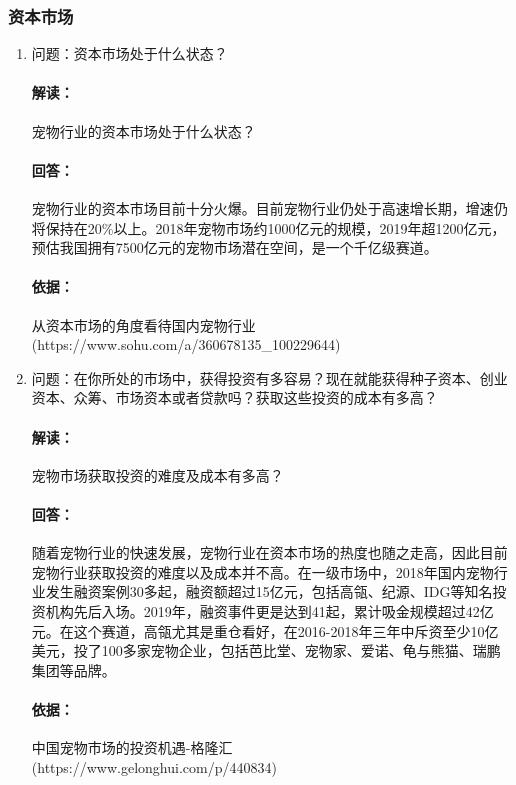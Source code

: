 \documentclass[a4paper]{ctexart}
\begin{document}
\subsubsection{资本市场}
\begin{enumerate}[label=\alph*.]
  \item 问题：资本市场处于什么状态？
  \paragraph{解读：}宠物行业的资本市场处于什么状态？
  \paragraph{回答：}宠物行业的资本市场目前十分火爆。目前宠物行业仍处于高速增长期，增速仍将保持在20\%以上。2018年宠物市场约1000亿元的规模，2019年超1200亿元，预估我国拥有7500亿元的宠物市场潜在空间，是一个千亿级赛道。
  \paragraph{依据：}从资本市场的角度看待国内宠物行业\\(https://www.sohu.com/a/360678135\_100229644)
  \item 问题：在你所处的市场中，获得投资有多容易？现在就能获得种子资本、创业资本、众筹、市场资本或者贷款吗？获取这些投资的成本有多高？
  \paragraph{解读：}宠物市场获取投资的难度及成本有多高？
  \paragraph{回答：}随着宠物行业的快速发展，宠物行业在资本市场的热度也随之走高，因此目前宠物行业获取投资的难度以及成本并不高。在一级市场中，2018年国内宠物行业发生融资案例30多起，融资额超过15亿元，包括高瓴、纪源、IDG等知名投资机构先后入场。2019年，融资事件更是达到41起，累计吸金规模超过42亿元。在这个赛道，高瓴尤其是重仓看好，在2016-2018年三年中斥资至少10亿美元，投了100多家宠物企业，包括芭比堂、宠物家、爱诺、龟与熊猫、瑞鹏集团等品牌。
  \paragraph{依据：}中国宠物市场的投资机遇-格隆汇 \\(https://www.gelonghui.com/p/440834)
\end{enumerate}
\end{document}
